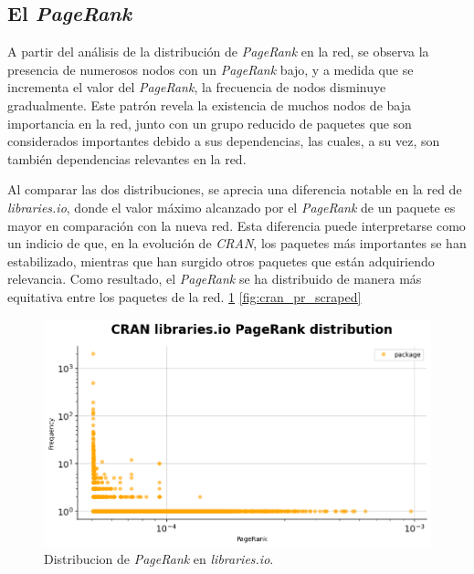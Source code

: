 \subsection{El \textit{PageRank}}

A partir del análisis de la distribución de \textit{PageRank} en la red, se observa la presencia
de numerosos nodos con un \textit{PageRank} bajo, y a medida que se incrementa el valor del
\textit{PageRank}, la frecuencia de nodos disminuye gradualmente. Este patrón revela la
existencia de muchos nodos de baja importancia en la red, junto con un grupo reducido de
paquetes que son considerados importantes debido a sus dependencias, las cuales, a su vez,
son también dependencias relevantes en la red.

Al comparar las dos distribuciones, se aprecia una diferencia notable en la red
de \textit{libraries.io}, donde el valor máximo alcanzado por el \textit{PageRank} de
un paquete es mayor en comparación con la nueva red. Esta diferencia puede interpretarse
como un indicio de que, en la evolución de \textit{CRAN}, los paquetes más importantes
se han estabilizado, mientras que han surgido otros paquetes que están adquiriendo
relevancia. Como resultado, el \textit{PageRank} se ha distribuido de manera más equitativa
entre los paquetes de la red. \ref{fig:cran_pr_libio} \ref{fig:cran_pr_scraped}

\begin{figure}[ht!]
    \begin{center}
        \includegraphics[width=1\textwidth]{img/cran/pr.png}
        \caption{Distribucion de \textit{PageRank} en \textit{libraries.io}.}
        \label{fig:cran_pr_libio}
    \end{center}
\end{figure}

